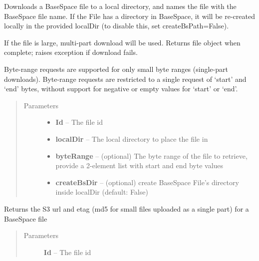 \documentclass[letterpaper,10pt,english]{sphinxmanual}
\begin{document}
\begin{fulllineitems}
\begin{fulllineitems}
\end{fulllineitems}


\begin{fulllineitems}
\label{Available modules:BaseSpacePy.api.BaseSpaceAPI.BaseSpaceAPI.fileDownload}
Downloads a BaseSpace file to a local directory, and names the file with the BaseSpace file name.
If the File has a directory in BaseSpace, it will be re-created locally in the provided localDir 
(to disable this, set createBsPath=False).

If the file is large, multi-part download will be used. 
Returns file object when complete; raises exception if download fails.

Byte-range requests are supported for only small byte ranges (single-part downloads).
Byte-range requests are restricted to a single request of `start' and `end' bytes, without support for
negative or empty values for `start' or `end'.
\begin{quote}\begin{description}
\item[{Parameters}] \leavevmode\begin{itemize}
\item {} 
\textbf{Id} -- The file id

\item {} 
\textbf{localDir} -- The local directory to place the file in

\item {} 
\textbf{byteRange} -- (optional) The byte range of the file to retrieve, provide a 2-element list with start and end byte values

\item {} 
\textbf{createBsDir} -- (optional) create BaseSpace File's directory inside localDir (default: False)

\end{itemize}

\end{description}\end{quote}

\end{fulllineitems}


\begin{fulllineitems}
\label{Available modules:BaseSpacePy.api.BaseSpaceAPI.BaseSpaceAPI.fileS3metadata}
Returns the S3 url and etag (md5 for small files uploaded as a single part) for a BaseSpace file
\begin{quote}\begin{description}
\item[{Parameters}] \leavevmode
\textbf{Id} -- The file id


\end{description}
\end{quote}
\end{fulllineitems}
\end{fulllineitems}
\end{document}
